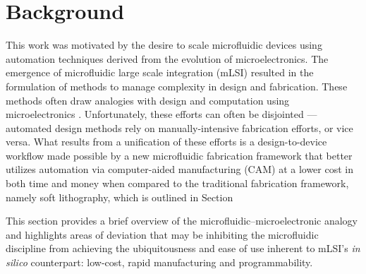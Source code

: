 \chapter{Background}
\label{chapter:background}
\thispagestyle{myheadings}

\graphicspath{{1a_background/Figures/}}

This work was motivated by the desire to scale microfluidic devices using automation techniques derived from the evolution of microelectronics. The emergence of microfluidic large scale integration (mLSI) resulted in the formulation of methods to manage complexity in design and fabrication. These methods often draw analogies with design and computation using microelectronics \cite{minhass2013}. Unfortunately, these efforts can often be disjointed --- automated design methods rely on manually-intensive fabrication efforts, or vice versa. What results from a unification of these efforts is a design-to-device workflow made possible by a new microfluidic fabrication framework that better utilizes automation via computer-aided manufacturing (CAM) at a lower cost in both time and money when compared to the traditional fabrication framework, namely soft lithography, which is outlined in Section 

This section provides a brief overview of the microfluidic--microelectronic analogy and highlights areas of deviation that may be inhibiting the microfluidic discipline from achieving the ubiquitousness and ease of use inherent to mLSI's \emph{in silico} counterpart: low-cost, rapid manufacturing and programmability.


